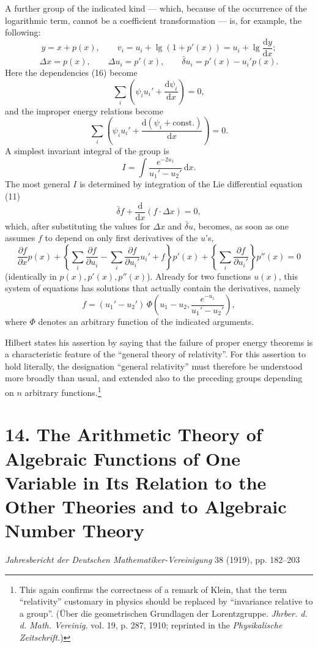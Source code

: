 \documentclass[11pt]{article}
\newcommand{\D}{\Delta}
\providecommand{\dd}{\mathrm d}
\providecommand{\bd}{\bar{\delta}}
\providecommand{\p}{\partial}
\begin{document}
A further group of the indicated kind --- which, because of the occurrence of the logarithmic term, cannot be a coefficient transformation --- is, for example, the following:
\[
y=x+p(x),\qquad
v_i=u_i+\lg(1+p'(x))=u_i+\lg\frac{\dd y}{\dd x};
\]
\[
\D x=p(x),\qquad
\D u_i=p'(x),\qquad
\bd u_i=p'(x)-u_i'p(x).
\]
Here the dependencies (16) become
\[
\sum_i\left(\psi_i u_i'+\frac{\dd\psi_i}{\dd x}\right)=0,
\]
and the improper energy relations become
\[
\sum_i\left(\psi_i u_i'+
\frac{\dd(\psi_i+\mathrm{const.})}{\dd x}\right)=0.
\]
A simplest invariant integral of the group is
\[
I=\int \frac{e^{-2u_1}}{u_1'-u_2'}\,\dd x.
\]
The most general \(I\) is determined by integration of the Lie differential equation (11)
\[
\bd f+\frac{\dd}{\dd x}(f\cdot \D x)=0,
\]
which, after substituting the values for \(\D x\) and \(\bd u\), becomes, as soon as one assumes \(f\) to depend on only first derivatives of the \(u\)'s,
\[
\frac{\p f}{\p x}p(x)
+\left\{\sum_i\frac{\p f}{\p u_i}
-\sum_i\frac{\p f}{\p u_i'}u_i'+f\right\}p'(x)
+\left\{\sum_i\frac{\p f}{\p u_i'}\right\}p''(x)=0
\]
(identically in \(p(x),p'(x),p''(x)\)). Already for two functions \(u(x)\), this system of equations has solutions that actually contain the derivatives, namely
\[
f=(u_1'-u_2')\,
\Phi\!\left(u_1-u_2,\frac{e^{-u_1}}{u_1'-u_2'}\right),
\]
where \(\Phi\) denotes an arbitrary function of the indicated arguments.

Hilbert states his assertion by saying that the failure of proper energy theorems is a characteristic feature of the ``general theory of relativity''. For this assertion to hold literally, the designation ``general relativity'' must therefore be understood more broadly than usual, and extended also to the preceding groups depending on \(n\) arbitrary functions.\footnote{This again confirms the correctness of a remark of Klein, that the term ``relativity'' customary in physics should be replaced by ``invariance relative to a group''. (Über die geometrischen Grundlagen der Lorentzgruppe. \emph{Jhrber. d. d. Math. Vereinig.} vol. 19, p. 287, 1910; reprinted in the \emph{Physikalische Zeitschrift}.)}


\section*{14. The Arithmetic Theory of Algebraic Functions of One Variable in Its Relation to the Other Theories and to Algebraic Number Theory}
\begin{center}
\emph{Jahresbericht der Deutschen Mathematiker-Vereinigung} 38 (1919), pp. 182--203
\end{center}
\end{document}
